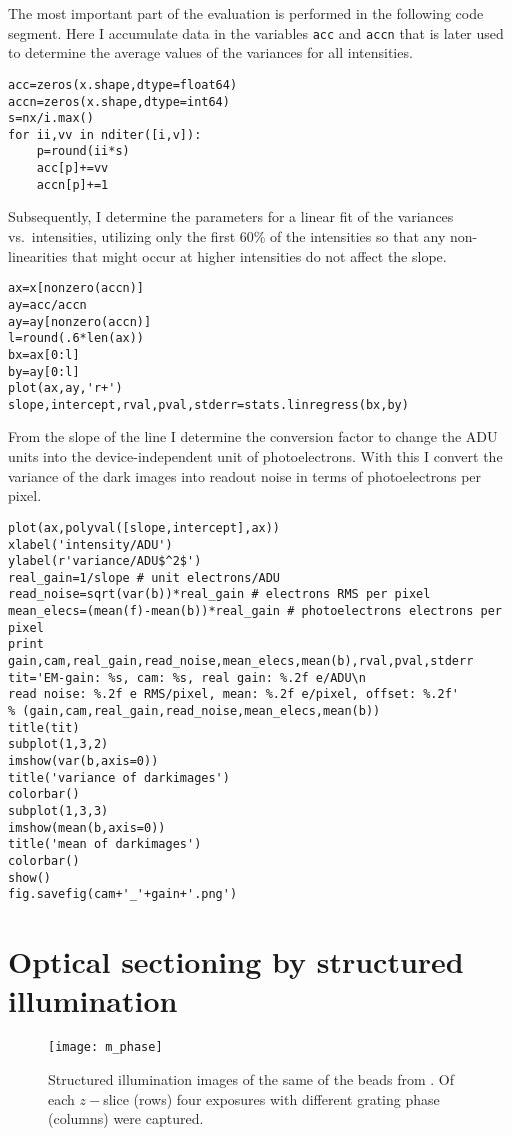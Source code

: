 The most important part of the evaluation is performed in the
following code segment. Here I accumulate data in the variables
\verb!acc! and \verb!accn! that is later used to determine the average
values of the variances for all intensities.
\begin{lstlisting}[style=mypython]
acc=zeros(x.shape,dtype=float64)
accn=zeros(x.shape,dtype=int64)
s=nx/i.max()
for ii,vv in nditer([i,v]):
    p=round(ii*s)
    acc[p]+=vv
    accn[p]+=1   
\end{lstlisting}
Subsequently, I determine the parameters for a linear fit of the
variances vs.\ intensities, utilizing only the first 60\% of the
intensities so that any non-linearities that might occur at higher
intensities do not affect the slope.
\begin{lstlisting}[style=mypython]
ax=x[nonzero(accn)]
ay=acc/accn
ay=ay[nonzero(accn)]
l=round(.6*len(ax))
bx=ax[0:l]
by=ay[0:l]
plot(ax,ay,'r+')
slope,intercept,rval,pval,stderr=stats.linregress(bx,by)
\end{lstlisting}
From the slope of the line I determine the conversion factor to change
the ADU units into the device-independent unit of photoelectrons. With
this I convert the variance of the dark images into readout noise in
terms of photoelectrons per pixel.
\begin{lstlisting}[style=mypython]
plot(ax,polyval([slope,intercept],ax))
xlabel('intensity/ADU')
ylabel(r'variance/ADU$^2$')
real_gain=1/slope # unit electrons/ADU
read_noise=sqrt(var(b))*real_gain # electrons RMS per pixel
mean_elecs=(mean(f)-mean(b))*real_gain # photoelectrons electrons per pixel
print gain,cam,real_gain,read_noise,mean_elecs,mean(b),rval,pval,stderr
tit='EM-gain: %s, cam: %s, real gain: %.2f e/ADU\n
read noise: %.2f e RMS/pixel, mean: %.2f e/pixel, offset: %.2f'
% (gain,cam,real_gain,read_noise,mean_elecs,mean(b))
title(tit)
subplot(1,3,2)
imshow(var(b,axis=0))
title('variance of darkimages')
colorbar()
subplot(1,3,3)
imshow(mean(b,axis=0))
title('mean of darkimages')
colorbar()
show()
fig.savefig(cam+'_'+gain+'.png')
\end{lstlisting}


\chapter{Optical sectioning by structured illumination}


\begin{figure}[H]
  \centering
  \texttt{[image: m\_phase]}
  \caption{Structured illumination images of the same of the beads
    from . Of each $z-$slice (rows) four exposures
    with different grating phase (columns) were captured.}
  \label{fig:m_phase}
\end{figure}

